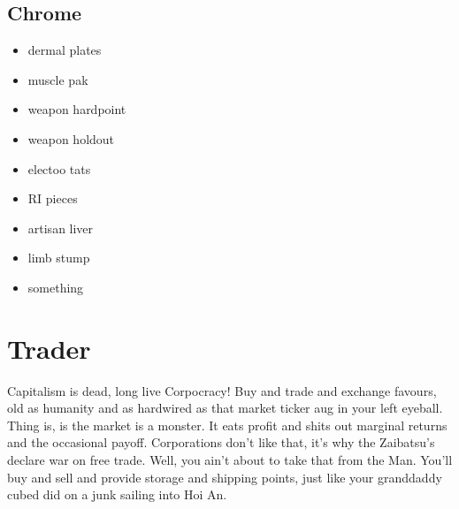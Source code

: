 \documentclass{tufte-book}
\begin{document}
\subsection{Chrome}
\begin{multicols}{3}
\begin{itemize}
\item dermal plates
\item muscle pak
\item weapon hardpoint
\item weapon holdout
\item electoo tats
\item RI pieces
\item artisan liver
\item limb stump
\item something
\end{itemize}
\end{multicols}




\section{Trader} \label{sec:Trader}

Capitalism is dead, long live Corpocracy! Buy and trade and exchange favours, old as humanity and as hardwired as that market ticker aug in your left eyeball. Thing is, is the market is a monster. It eats profit and shits out marginal returns and the occasional payoff. Corporations don't like that, it's why the Zaibatsu's declare war on free trade. Well, you ain't about to take that from the Man. You'll buy and sell and provide storage and shipping points, just like your granddaddy cubed did on a junk sailing into Hoi An.

\end{document}
